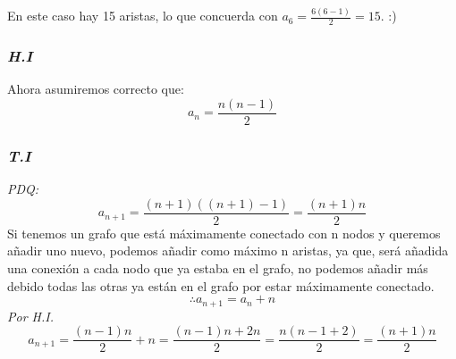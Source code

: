 \documentclass[../doc.tex]{subfiles}
\begin{document}
\begin{center}
\end{center}
En este caso hay 15 aristas, lo que concuerda con $a_6 = \frac{6(6-1)}{2} = 15$. :)


\subsubsection*{\emph{H.I}}
Ahora asumiremos correcto que:
\[ a_n = \frac{n(n-1)}{2} \]

\subsubsection*{\emph{T.I}}
\emph{PDQ:}
\[ a_{n+1} = \frac{(n+1)((n+1) - 1)}{2} = \frac{(n+1)n}{2} \]
Si tenemos un grafo que está máximamente conectado con n nodos y queremos añadir
uno nuevo, podemos añadir como máximo n aristas, ya que, será añadida una conexión a 
cada nodo que ya estaba en el grafo, no podemos añadir más debido todas las otras 
ya están en el grafo por estar máximamente conectado.
\[ \therefore a_{n+1} = a_n + n \]
\emph{Por H.I.}
\[ a_{n+1} = \frac{(n-1)n}{2} + n = \frac{(n-1)n + 2n}{2} = \frac{n(n-1+2)}{2} = \frac{(n+1)n}{2} \]
\end{document}
